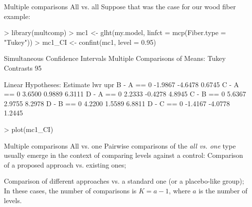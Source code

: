 \documentclass[t]{beamer}
\begin{document}
\begin{ftstf}
{Multiple comparisons}
{All vs. all}
Suppose that was the case for our wood fiber example:

\begin{rcode}
> library(multcomp)
> mc1    <- glht(my.model, linfct = mcp(Fiber.type = "Tukey"))
> mc1_CI <- confint(mc1, level = 0.95)

Simultaneous Confidence Intervals
Multiple Comparisons of Means: Tukey Contrasts
95%

Linear Hypotheses:
           Estimate lwr     upr    
B - A == 0 -1.9867  -4.6478  0.6745
C - A == 0  3.6500   0.9889  6.3111
D - A == 0  2.2333  -0.4278  4.8945
C - B == 0  5.6367   2.9755  8.2978
D - B == 0  4.2200   1.5589  6.8811
D - C == 0 -1.4167  -4.0778  1.2445

> plot(mc1_CI)
\end{rcode}
\end{ftstf}


\begin{ftst}
{Multiple comparisons}
{All vs. one}
Pairwise comparisons of the \textit{all vs. one} type usually emerge in the context of comparing levels against a control:
\vhalf
\bitems Comparison of a proposed approach vs. existing ones;
\vhalf\item Comparison of different approaches vs. a standard one (or a placebo-like group);
\eitem
\vhalf
In these cases, the number of comparisons is $K = a-1$, where $a$ is the number of levels. %

\end{ftst}
\end{document}
